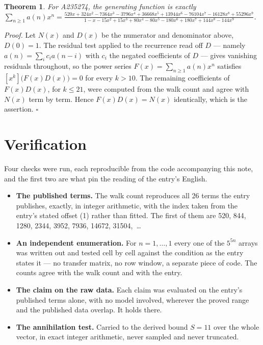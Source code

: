 \documentclass[11pt]{article}
\newtheorem{theorem}{Theorem}
\theoremstyle{definition}
\begin{document}
\begin{theorem} For A235274, the generating function is exactly $\sum_{n\ge 1} a(n)x^n = \frac{520x + 324x^{2} - 7364x^{3} - 3796x^{4} + 36668x^{5} + 13944x^{6} - 76104x^{7} - 16128x^{8} + 55296x^{9}}{1 - x - 15x^{2} + 15x^{3} + 80x^{4} - 80x^{5} - 180x^{6} + 180x^{7} + 144x^{8} - 144x^{9}}$.\end{theorem}

{\itshape Proof.} Let $N(x)$ and $D(x)$ be the numerator and denominator above, $D(0)=1$. The residual test applied to the recurrence read off $D$ --- namely $a(n) = \sum_i c_i a(n-i)$ with $c_i$ the negated coefficients of $D$ --- gives vanishing residuals throughout, so the power series $F(x)=\sum_{n\ge 1}a(n)x^n$ satisfies $[x^k]\bigl(F(x)D(x)\bigr) = 0$ for every $k > 10$. The remaining coefficients of $F(x)D(x)$, for $k \le 21$, were computed from the walk count and agree with $N(x)$ term by term. Hence $F(x)D(x) = N(x)$ identically, which is the assertion. $\square$

\section{Verification}

Four checks were run, each reproducible from the code accompanying this note, and the first two are what pin the reading of the entry's English.

\begin{itemize}

\item {\bfseries The published terms.} The walk count reproduces all 26 terms the entry publishes, exactly, in integer arithmetic, with the index taken from the entry's stated offset (1) rather than fitted. The first of them are 520, 844, 1280, 2344, 3952, 7936, 14672, 31504,~\dots

\item {\bfseries An independent enumeration.} For $n = 1,\dots,1$ every one of the $5^{5n}$ arrays was written out and tested cell by cell against the condition as the entry states it --- no transfer matrix, no row window, a separate piece of code. The counts agree with the walk count and with the entry.

\item {\bfseries The claim on the raw data.} Each claim was evaluated on the entry's published terms alone, with no model involved, wherever the proved range and the published data overlap. It holds there.

\item {\bfseries The annihilation test.} Carried to the derived bound $S = 11$ over the whole vector, in exact integer arithmetic, never sampled and never truncated.

\end{itemize}
\end{document}
